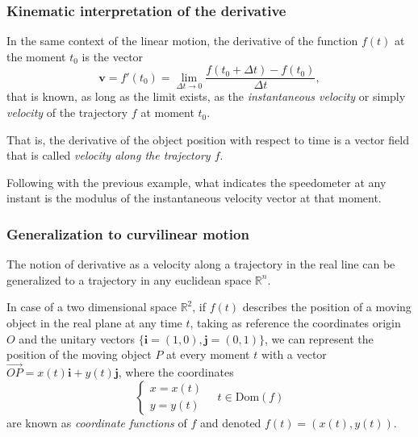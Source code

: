 \begin{frame}
\frametitle{Kinematic interpretation of the derivative}
In the same context of the linear motion, the derivative of the function $f(t)$ at the moment $t_0$ is the vector
\[
\mathbf{v}=f'(t_0)=\lim_{\Delta t\rightarrow 0}\frac{f(t_0+\Delta t)-f(t_0)}{\Delta t},
\]
that is known, as long as the limit exists, as the \emph{instantaneous velocity} or simply \emph{velocity} of the trajectory $f$ at moment $t_0$.

That is, the derivative of the object position with respect to time is a vector field that is called \emph{velocity along the trajectory $f$}.

Following with the previous example, what indicates the speedometer at any instant is the modulus of the instantaneous velocity vector at that moment.
\end{frame}


\begin{frame}
\frametitle{Generalization to curvilinear motion}
The notion of derivative as a velocity along a trajectory in the real line can be generalized to a trajectory in any euclidean space $\mathbb{R}^n$.

In case of a two dimensional space $\mathbb{R}^2$, if $f(t)$ describes the position of a moving object in the real plane at any time $t$, taking as reference the coordinates origin $O$ and the unitary vectors $\{\mathbf{i}=(1,0),\mathbf{j}=(0,1)\}$, we can represent the position of the moving object $P$ at every moment $t$ with a vector $\vec{OP}=x(t)\mathbf{i}+y(t)\mathbf{j}$, where the coordinates 
\[
\begin{cases}
x=x(t)\\
y=y(t)
\end{cases}
\quad
t\in \mbox{Dom}(f)
\]
are known as \emph{coordinate functions} of $f$ and denoted $f(t)=(x(t),y(t))$.

\begin{center}
\scalebox{0.8}{}
\end{center}
\end{frame}


